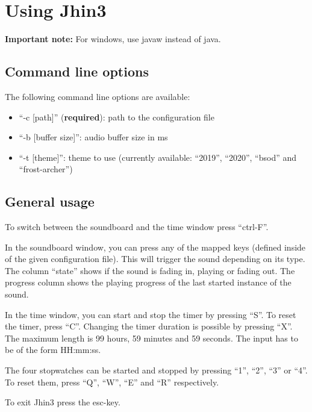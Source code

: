 \section{Using Jhin3}

\textbf{Important note:} For windows, use javaw instead of java.

\subsection{Command line options}

The following command line options are available:
\begin{itemize}
\item ``-c [path]'' (\textbf{required}): path to the configuration file
\item ``-b [buffer size]'': audio buffer size in ms
\item ``-t [theme]'': theme to use (currently available: ``2019'', ``2020'', ``bsod'' and ``frost-archer'')
\end{itemize}

\subsection{General usage}

To switch between the soundboard and the time window press ``ctrl-F''.

In the soundboard window, you can press any of the mapped keys (defined inside of the given configuration file). This will trigger the sound depending on its type.
The column ``state'' shows if the sound is fading in, playing or fading out. The progress column shows the playing progress of the last started instance of the sound.

In the time window, you can start and stop the timer by pressing ``S''. To reset the timer, press ``C''.
Changing the timer duration is possible by pressing ``X''. The maximum length is 99 hours, 59 minutes and 59 seconds. The input has to be of the form HH:mm:ss.

The four stopwatches can be started and stopped by pressing ``1'', ``2'', ``3'' or ``4''. To reset them, press ``Q'', ``W'', ``E'' and ``R'' respectively.

To exit Jhin3 press the esc-key.